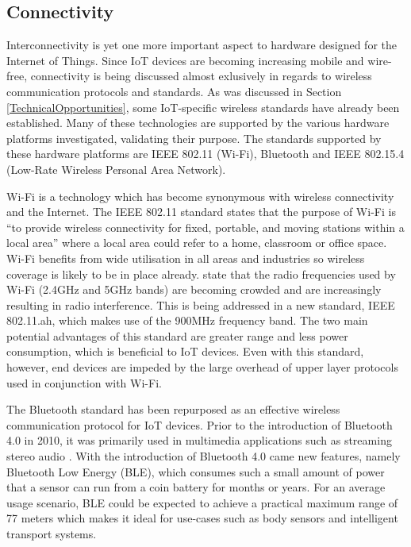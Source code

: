     \subsection{Connectivity}
      Interconnectivity is yet one more important aspect to hardware designed for the Internet of Things. Since IoT devices are becoming increasing mobile and wire-free, connectivity is being discussed almost exlusively in regards to wireless communication protocols and standards. As was discussed in Section \ref{TechnicalOpportunities}, some IoT-specific wireless standards have already been established. Many of these technologies are supported by the various hardware platforms investigated, validating their purpose. The standards supported by these hardware platforms are IEEE 802.11 (Wi-Fi), Bluetooth and IEEE 802.15.4 (Low-Rate Wireless Personal Area Network). 

      Wi-Fi is a technology which has become synonymous with wireless connectivity and the Internet. The IEEE 802.11 standard states that the purpose of Wi-Fi is ``to provide wireless connectivity for fixed, portable, and moving stations within a local area'' where a local area could refer to a home, classroom or office space. Wi-Fi benefits from wide utilisation in all areas and industries so wireless coverage is likely to be in place already. \citet{wifiah:2012} state that the radio frequencies used by Wi-Fi (2.4GHz and 5GHz bands) are becoming crowded and are increasingly resulting in radio interference. This is being addressed in a new standard, IEEE 802.11.ah, which makes use of the 900MHz frequency band. The two main potential advantages of this standard are greater range and less power consumption, which is beneficial to IoT devices. Even with this standard, however, end devices are impeded by the large overhead of upper layer protocols used in conjunction with Wi-Fi.

      The Bluetooth standard has been repurposed as an effective wireless communication protocol for IoT devices. Prior to the introduction of Bluetooth 4.0 in 2010, it was primarily used in multimedia applications such as streaming stereo audio \citep{bluetooth:2014}. With the introduction of Bluetooth 4.0 came new features, namely Bluetooth Low Energy (BLE), which consumes such a small amount of power that a sensor can run from a coin battery for months or years. For an average usage scenario, BLE could be expected to achieve a practical maximum range of 77 meters \citep{linklabs:2015} which makes it ideal for use-cases such as body sensors and intelligent transport systems.

